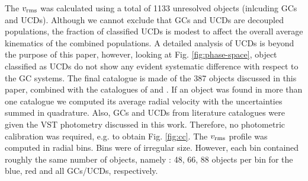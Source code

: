 \documentclass[useAMS,usenatbib]{mn2e}
\begin{document}
The $v_{\rm rms}$ was calculated using a total of 1133 unresolved objects (inlcuding GCs and UCDs). Although we cannot exclude that GCs and UCDs are decoupled populations, 
the fraction of classified UCDs is modest to affect the overall average kinematics of the combined populations. A detailed analysis of UCDs is beyond the purpose of this paper,
however, looking at Fig. \ref{fig:phase-space}, object classified as UCDs do not show any evident systematic difference with respect to the GC systems. 
The final catalogue is made of the 387 objects discussed in this paper, combined with the catalogues of \citet{Bergond07} and \citet{Schuberth}. If an object was found in more than one catalogue we computed its average radial velocity with the uncertainties summed in quadrature. Also, GCs and UCDs from literature catalogues were given the VST photometry discussed in this work. Therefore, no photometric calibration was required, e.g. to obtain Fig. \ref{fig:cc}. The $v_{\rm rms}$ profile was computed in radial bins. Bins were of irregular size. However, each bin contained roughly the same number of objects, namely : 48, 66, 88 objects per bin for the blue, red and all GCs/UCDs, respectively. 
\end{document}
